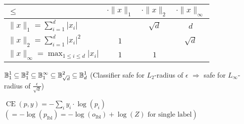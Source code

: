 \begin{tabular}{|l|c|c|c|}
\hline
$\le$ & $\cdot\|x\|_1$ & $\cdot\|x\|_2$ & $\cdot\|x\|_\infty$ \\\hline

$\|x\|_1=\sum_{i=1}^d \lvert x_i \rvert$ & & $\sqrt{d}$ & $d$ \\\hline

$\|x\|_2=\sum_{i=1}^d \lvert x_i \rvert^2$  & $1$ & & $\sqrt{d}$ \\\hline

$\|x\|_\infty=\max_{1\le i\le d} \lvert x_i \rvert$ & $1$ & $1$ & \\\hline
\end{tabular}

$\operatorname*{\mathbb{B}}_1^1 \subseteq \operatorname*{\mathbb{B}}_1^2 \subseteq \operatorname*{\mathbb{B}}_1^\infty \subseteq \operatorname*{\mathbb{B}}_{\sqrt{d}}^2 \subseteq \operatorname*{\mathbb{B}}_d^1$
(Classifier safe for $L_2$-radius of $\epsilon$ $\Rightarrow$ safe for $L_\infty$-radius of $\frac{\epsilon}{\sqrt{d}}$)

$\operatorname{CE}(p, y) = - \sum_i y_i \cdot \log(p_i)$
$(= -\log(p_\text{lbl}) = -\log(o_\text{lbl}) + \log(Z) \text{ for single label})$